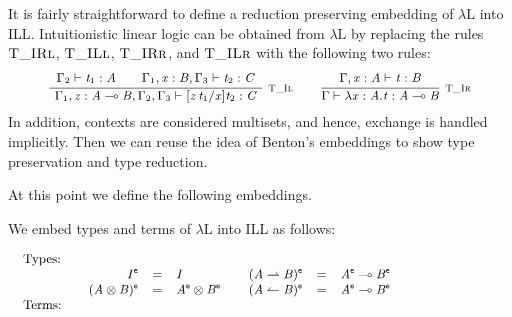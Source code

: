 \documentclass{llncs}
\newcommand{\Ldrule}[4][]{{\displaystyle\frac{\begin{array}{l}#2\end{array}}{#3}\quad\Ldrulename{#4}}}
\newcommand{\Lpremise}[1]{ #1 \\}
\newcommand{\Lnt}[1]{\mathit{#1}}
\newcommand{\Lmv}[1]{\mathit{#1}}
\newcommand{\Lsym}[1]{#1}
\newcommand{\Ldrulename}[1]{\textsc{#1}}
\newcommand{\LdruleTXXIlName}[0]{\Ldrulename{T\_Il}}
\newcommand{\LdruleTXXIl}[1]{\Ldrule[#1]{%
\Lpremise{  \Gamma_{{\mathrm{2}}}  \vdash  \Lnt{t_{{\mathrm{1}}}}  :  \Lnt{A}   \qquad   \Gamma_{{\mathrm{1}}}  \Lsym{,}  \Lmv{x}  \Lsym{:}  \Lnt{B}  \Lsym{,}  \Gamma_{{\mathrm{3}}}  \vdash  \Lnt{t_{{\mathrm{2}}}}  :  \Lnt{C}  }%
}{
 \Gamma_{{\mathrm{1}}}  \Lsym{,}  \Lmv{z}  \Lsym{:}   \Lnt{A}  \multimap  \Lnt{B}   \Lsym{,}  \Gamma_{{\mathrm{2}}}  \Lsym{,}  \Gamma_{{\mathrm{3}}}  \vdash  \Lsym{[}   \Lmv{z} \, \Lnt{t_{{\mathrm{1}}}}   \Lsym{/}  \Lmv{x}  \Lsym{]}  \Lnt{t_{{\mathrm{2}}}}  :  \Lnt{C} }{%
{\LdruleTXXIlName}{}%
}}
\newcommand{\LdruleTXXIrName}[0]{\Ldrulename{T\_Ir}}
\newcommand{\LdruleTXXIr}[1]{\Ldrule[#1]{%
\Lpremise{ \Gamma  \Lsym{,}  \Lmv{x}  \Lsym{:}  \Lnt{A}  \vdash  \Lnt{t}  :  \Lnt{B} }%
}{
 \Gamma  \vdash   \lambda  \Lmv{x} : \Lnt{A} . \Lnt{t}   :   \Lnt{A}  \multimap  \Lnt{B}  }{%
{\LdruleTXXIrName}{}%
}}
\renewcommand{\Ldrule}[4][]{{\displaystyle\frac{\begin{array}{l}#2\end{array}}{#3}\,\,\Ldrulename{{\scriptsize #4}}}}
\begin{document}
It is fairly straightforward to define a reduction preserving
embedding of $\lambda\text{L}$ into ILL.  Intuitionistic linear logic
can be obtained from $\lambda\text{L}$ by replacing the rules
$\Ldrulename{T\_IRl}$, $\Ldrulename{T\_ILl}$, $\Ldrulename{T\_IRr}$,
and $\Ldrulename{T\_ILr}$ with the following two rules:
\[ \small
\begin{array}{cccccccc} 
  \LdruleTXXIl{} & \quad \LdruleTXXIr{}
\end{array}
\]
In addition, contexts are considered multisets, and hence, exchange is
handled implicitly. Then we can reuse the idea of Benton's embeddings
to show type preservation and type reduction.

At this point we define the following embeddings.
\begin{definition}
  \label{def:lambda-L_to_ILL}
  We embed types and terms of $\lambda\text{L}$ into ILL as follows:
  \begin{center}
    \begin{math} \small
      \begin{array}{lll}
        \begin{array}{lccc}
        \text{Types:}\\
        & \begin{array}{rll}
            \begin{array}{rll}
                I  ^{\mathsf{e} }  & = &  I \\
               \Lsym{(}   \Lnt{A}  \otimes  \Lnt{B}   \Lsym{)} ^{\mathsf{e} }  & = &   \Lnt{A} ^{\mathsf{e} }   \otimes    \Lnt{B} ^{\mathsf{e} }   \\
            \end{array}
            &
            \begin{array}{rll}
               \Lsym{(}   \Lnt{A}  \rightharpoonup  \Lnt{B}   \Lsym{)} ^{\mathsf{e} }  & = &   \Lnt{A} ^{\mathsf{e} }   \multimap    \Lnt{B} ^{\mathsf{e} }   \\
               \Lsym{(}   \Lnt{A}  \leftharpoonup  \Lnt{B}   \Lsym{)} ^{\mathsf{e} }  & = &   \Lnt{A} ^{\mathsf{e} }   \multimap    \Lnt{B} ^{\mathsf{e} }   \\                    
            \end{array}
          \end{array}                
      \end{array}
      \\
      \begin{array}{lll}
        \text{Terms:}\\

\end{array}
\end{array}
\end{math}
\end{center}
\end{definition}
\end{document}
